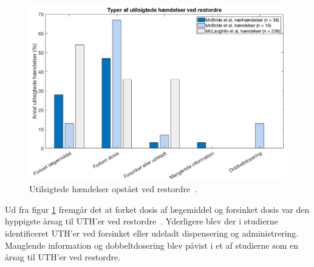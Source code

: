 \begin{figure}[H]\centering
	\includegraphics[width=1\textwidth]{billeder/UTH2.png} 
	\caption{Utilsigtede hændelser opstået ved restordre~\citep{McLaughlin2013,McBride2013}.}
	\label{fig:UTHrestordre}  
\end{figure}

Ud fra figur \ref{fig:UTHrestordre} fremgår det at forket dosis af lægemiddel og forsinket dosis var den hyppigste årsag til UTH'er ved restordre~\citep{McLaughlin2013,McBride2013}. Yderligere blev der i studierne identificeret UTH'er ved forsinket eller udeladt dispensering og administrering. Manglende information og dobbeltdosering blev påvist i et af studierne som en årsag til UTH'er ved restordre.~\citep{McLaughlin2013,McBride2013}